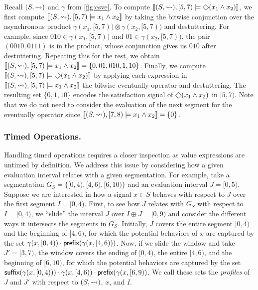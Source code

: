 \vspace{-0.5em}
\begin{example}
	Recall $(S, {\rightsquigarrow})$ and $\gamma$ from \cref{fig:csve}.
	To compute $\llbracket (S, {\hb}), [5,7) \models \LTLeventually(x_1 \land x_2) \rrbracket$, we first compute $\llbracket (S, {\rightsquigarrow}), [5,7) \models x_1 \land x_2 \rrbracket$ by taking the bitwise conjunction over the asynchronous product $\gamma(x_1, [5,7)) \otimes \gamma(x_2, [5,7))$ and destuttering.
	For example, since $010 \in \gamma(x_1, [5,7))$ and $01 \in \gamma(x_2, [5,7))$, the pair $(0010,0111)$ is in the product, whose conjunction gives us $010$ after destuttering. 
	Repeating this for the rest, we obtain $\llbracket (S, {\rightsquigarrow}), [5,7) \models x_1 \land x_2 \rrbracket = \{ 0, 01, 010, 1, 10 \}$.
	Finally, we compute $\llbracket (S, {\hb}), [5,7) \models \LTLeventually(x_1 \land x_2) \rrbracket$ by applying each expression in $\llbracket (S, {\rightsquigarrow}), [5,7) \models x_1 \land x_2 \rrbracket$ the bitwise eventually operator and destuttering.
	The resulting set $\{0, 1, 10\}$ encodes the satisfaction signal of $\LTLeventually(x_1 \land x_2)$ in $[5,7)$.
	Note that we do not need to consider the evaluation of the next segment for the eventually operator since $\llbracket (S, {\rightsquigarrow}), [7,8) \models x_1 \land x_2 \rrbracket = \{0\}$.
\end{example}

\vspace{-0.7em}
\subsubsection{Timed Operations.}
Handling timed operations requires a closer inspection as value expressions are untimed by definition.
We address this issue by considering how a given evaluation interval relates with a given segmentation.
For example, take a segmentation $G_S = \{ [0,4), [4,6), [6,10) \}$ and an evaluation interval $J = [0,5)$.
Suppose we are interested in how a signal $x \in S$ behaves with respect to $J$ over the first segment $I = [0,4)$.
First, to see how $J$ relates with $G_S$ with respect to $I =[0,4)$, we  ``slide'' the interval $J$ over $I \oplus J = [0,9)$ and consider the different ways it intersects the segments in $G_S$.
Initially, $J$ covers the entire segment $[0,4)$ and the beginning of $[4,6)$, for which the potential behaviors of $x$ are captured by the set $\gamma(x, [0,4)) \cdot \textsf{prefix}(\gamma(x, [4,6)))$.
Now, if we slide the window and take $J' = [3,7)$, the window covers the ending of $[0,4)$, the entire $[4,6)$, and the beginning of $[6,10)$, for which the potential behaviors are captured by the set $\textsf{suffix}(\gamma(x, [0,4))) \cdot \gamma(x, [4,6)) \cdot \textsf{prefix}(\gamma(x, [6,9))$.
We call these sets the \emph{profiles} of $J$ and $J'$ with respect to $(S,{\rightsquigarrow})$, $x$, and $I$.

